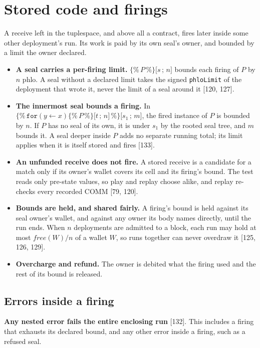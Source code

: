 \documentclass[10.5pt]{article}
\newcommand{\ob}{\texttt{\{\%}}
\newcommand{\cb}{\texttt{\%\}}}
\newcommand{\sealed}[2]{\ensuremath{\ob\,#1\,\cb\texttt{[}#2\texttt{]}}}
\newcommand{\code}[1]{\texttt{#1}}
\newcommand{\D}[1]{{\color{muted}\small[#1]}}
\begin{document}
\section{Stored code and firings}\label{sec:stored}

A receive left in the tuplespace, and above all a contract, fires later inside some other deployment's run. Its work is paid by its own seal's owner, and bounded by a limit the owner declared.

\begin{itemize}
\item \textbf{A seal carries a per-firing limit.} \sealed{P}{s\,;\,n} bounds each firing of $P$ by $n$ phlo. A seal without a declared limit takes the signed \code{phloLimit} of the deployment that wrote it, never the limit of a seal around it \D{120, 127}.
\item \textbf{The innermost seal bounds a firing.} In \sealed{\mathtt{for}(y \leftarrow x)\sealed{P}{t\,;\,n}}{s_1\,;\,m}, the fired instance of $P$ is bounded by $n$. If $P$ has no seal of its own, it is under $s_1$ by the rooted seal tree, and $m$ bounds it. A seal deeper inside $P$ adds no separate running total; its limit applies when it is itself stored and fires \D{133}.
\item \textbf{An unfunded receive does not fire.} A stored receive is a candidate for a match only if its owner's wallet covers its cell and its firing's bound. The test reads only pre-state values, so play and replay choose alike, and replay re-checks every recorded COMM \D{79, 120}.
\item \textbf{Bounds are held, and shared fairly.} A firing's bound is held against its seal owner's wallet, and against any owner its body names directly, until the run ends. When $n$ deployments are admitted to a block, each run may hold at most $\mathit{free}(W)/n$ of a wallet $W$, so runs together can never overdraw it \D{125, 126, 129}.
\item \textbf{Overcharge and refund.} The owner is debited what the firing used and the rest of its bound is released.
\end{itemize}

\subsection{Errors inside a firing}

\begin{keypoint}
\textbf{Any nested error fails the entire enclosing run} \D{132}. This includes a firing that exhausts its declared bound, and any other error inside a firing, such as a refused seal.
\end{keypoint}
\end{document}
